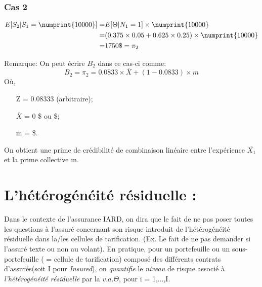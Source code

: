 \subsubsection*{Cas 2}
\begin{align*}
E[S_2|S_1 = \numprint{10000}] =& E[\Theta|N_1 = 1] \times  \numprint{10000} \\
=& (0.375\times 0.05 + 0.625\times 0.25) \times  \numprint{10000}\\
=& 1750\$ = \pi_2
\end{align*}

Remarque: On peut écrire $B_2$ dans ce cas-ci comme:
\begin{equation}
B_2 = \pi_2 = 0.0833 \times  \overline{X} + (1 - 0.0833) \times  m
\end{equation}
Où,
\begin{itemize}
\item[Z] = 0.08333 (arbitraire);
\item[$\overline{X}$] = 0 \$ ou \$;
\item[m] =  \$.
\end{itemize}
On obtient une prime de crédibilité de combinaison linéaire entre l'expérience $\overline{X_1}$ et la prime collective m.

\section{L'hétérogénéité résiduelle :}
Dans le contexte de l'assurance IARD, on dira que le fait de ne pas poser toutes les questions à l'assuré concernant son risque introduit de l'hétérogénéité résiduelle dans la/les cellules de tarification. (Ex. Le fait de ne pas demander si l'assuré texte ou non au volant). En pratique, pour un portefeuille ou un sous-portefeuille ( = cellule de tarification) composé des différents contrats d'assurés(soit I pour \emph{Insured}), on \emph{quantifie} le \emph{niveau} de risque associé à \emph{l'hétérogénéité résiduelle} par la $v.a.  \Theta$, pour i = 1,...,I.

